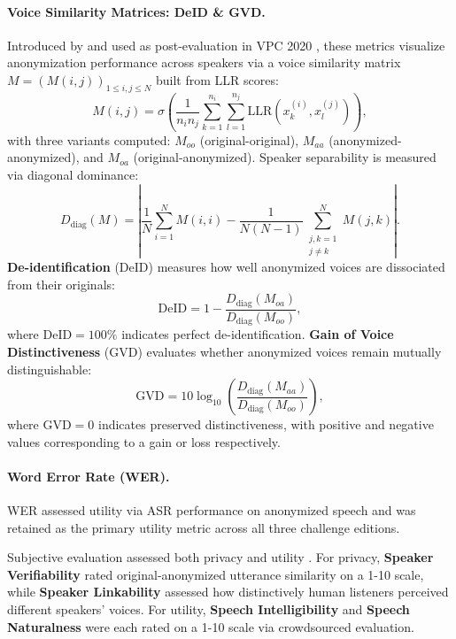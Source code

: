 \documentclass[12pt,leqno,a4paper]{article}
\begin{document}
\paragraph{Voice Similarity Matrices: DeID \& GVD.}
Introduced by \cite{10.1016/j.csl.2021.101299} and used as post-evaluation 
in VPC 2020 \citep{tomashenko_introducing_2020, tomashenko_voiceprivacy_2022-1, 
tomashenko_voiceprivacy_nodate}, these metrics visualize anonymization 
performance across speakers via a voice similarity matrix 
$M = (M(i,j))_{1 \leq i,j \leq N}$ built from LLR scores:
\begin{equation}
M(i, j) = \sigma \!\left(
  \frac{1}{n_i n_j}
  \sum_{k=1}^{n_i} \sum_{l=1}^{n_j}
  \mathrm{LLR}(x_k^{(i)}, x_l^{(j)})
\right),
\end{equation}
with three variants computed: $M_{oo}$ (original-original), $M_{aa}$ 
(anonymized-anonymized), and $M_{oa}$ (original-anonymized). Speaker 
separability is measured via diagonal dominance:
\begin{equation}
D_{\mathrm{diag}}(M) =
\left|
  \frac{1}{N} \sum_{i=1}^{N} M(i,i)
  - \frac{1}{N(N-1)} \sum_{\substack{j,k=1\\ j \neq k}}^{N} M(j,k)
\right|.
\end{equation}
\textbf{De-identification} (DeID) measures how well anonymized voices are 
dissociated from their originals:
\begin{equation}
\mathrm{DeID} = 1 - 
\frac{D_{\mathrm{diag}}(M_{oa})}{D_{\mathrm{diag}}(M_{oo})},
\end{equation}
where DeID$=100\%$ indicates perfect de-identification. \textbf{Gain of 
Voice Distinctiveness} (GVD) evaluates whether anonymized voices remain 
mutually distinguishable:
\begin{equation}
\mathrm{GVD} = 10 \log_{10}
\!\left(
  \frac{D_{\mathrm{diag}}(M_{aa})}{D_{\mathrm{diag}}(M_{oo})}
\right),
\end{equation}
where GVD$=0$ indicates preserved distinctiveness, with positive and 
negative values corresponding to a gain or loss respectively.

\paragraph{Word Error Rate (WER).}
WER assessed utility via ASR performance on anonymized speech and was 
retained as the primary utility metric across all three challenge editions.

Subjective evaluation assessed both privacy and utility 
\citep{tomashenko_voiceprivacy_2022-1, tomashenko_voiceprivacy_nodate}. 
For privacy, \textbf{Speaker Verifiability} rated original-anonymized 
utterance similarity on a 1-10 scale, while \textbf{Speaker Linkability} 
assessed how distinctively human listeners perceived different speakers' 
voices. For utility, \textbf{Speech Intelligibility} and \textbf{Speech 
Naturalness} were each rated on a 1-10 scale via crowdsourced evaluation. 
\end{document}
